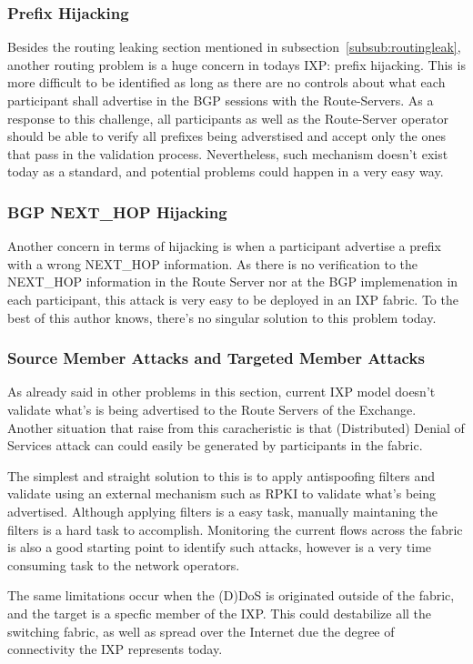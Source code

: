 \documentclass[conference]{IEEEtran/IEEEtran}
\begin{document}
\subsubsection{Prefix Hijacking}
Besides the routing leaking section mentioned in subsection~\ref{subsub:routingleak}, another routing problem is a huge concern in todays IXP: prefix hijacking. This is more difficult to be identified as long as there are no controls about what each participant shall advertise in the BGP sessions with the Route-Servers. As a response to this challenge, all participants as well as the Route-Server operator should be able to verify all prefixes being adverstised and accept only the ones that pass in the validation process. Nevertheless, such mechanism doesn't exist today as a standard, and potential problems could happen in a very easy way.

\subsubsection{BGP NEXT\_HOP Hijacking}
Another concern in terms of hijacking is when a participant advertise a prefix with a wrong NEXT\_HOP information. As there is no verification to the NEXT\_HOP information in the Route Server nor at the BGP implemenation in each participant, this attack is very easy to be deployed in an IXP fabric. To the best of this author knows, there's no singular solution to this problem today.

\subsubsection{Source Member Attacks and Targeted Member Attacks}
As already said in other problems in this section, current IXP model doesn't validate what's is being advertised to the Route Servers of the Exchange. Another situation that raise from this caracheristic is that (Distributed) Denial of Services attack can could easily be generated by participants in the fabric. 

The simplest and straight solution to this is to apply antispoofing filters and validate using an external mechanism such as RPKI to validate what's being advertised. Although applying filters is a easy task, manually maintaning the filters is a hard task to accomplish. Monitoring the current flows across the fabric is also a good starting point to identify such attacks, however is a very time consuming task to the network operators.

The same limitations occur when the (D)DoS is originated outside of the fabric, and the target is a specfic member of the IXP. This could destabilize all the switching fabric, as well as spread over the Internet due the degree of connectivity the IXP represents today.
\end{document}
